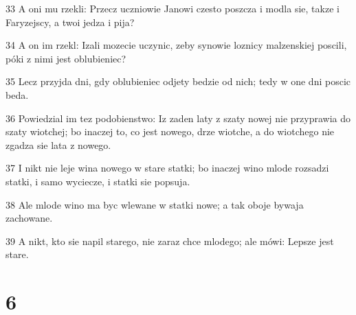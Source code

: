 \par 33 A oni mu rzekli: Przecz uczniowie Janowi czesto poszcza i modla sie, takze i Faryzejscy, a twoi jedza i pija?
\par 34 A on im rzekl: Izali mozecie uczynic, zeby synowie loznicy malzenskiej poscili, póki z nimi jest oblubieniec?
\par 35 Lecz przyjda dni, gdy oblubieniec odjety bedzie od nich; tedy w one dni poscic beda.
\par 36 Powiedzial im tez podobienstwo: Iz zaden laty z szaty nowej nie przyprawia do szaty wiotchej; bo inaczej to, co jest nowego, drze wiotche, a do wiotchego nie zgadza sie lata z nowego.
\par 37 I nikt nie leje wina nowego w stare statki; bo inaczej wino mlode rozsadzi statki, i samo wyciecze, i statki sie popsuja.
\par 38 Ale mlode wino ma byc wlewane w statki nowe; a tak oboje bywaja zachowane.
\par 39 A nikt, kto sie napil starego, nie zaraz chce mlodego; ale mówi: Lepsze jest stare.

\chapter{6}

